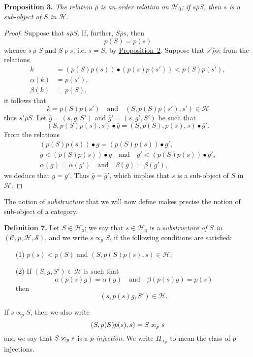 \documentclass[a4paper,oneside,nobib,nofonts,notitlepage,notoc,nols,fleqn,justified]{tufte-book}
\newenvironment{itenv}[1]
  {\phantomsection\par\medskip\noindent\textbf{#1.}\itshape}
  {\par\medskip}
\newenvironment{rmenv}[1]
  {\phantomsection\par\medskip\noindent\textbf{#1.}\rmfamily}
  {\par\medskip}
\newcommand{\oldpage}[1]{{\reversemarginpar\marginnote{\raggedleft\footnotesize\textit{p.~#1}}}}
\newcommand{\CC}{\mathcal{C}}
\newcommand{\HH}{\mathcal{H}}
\renewcommand{\SS}{\mathcal{S}}
\newcommand{\relrho}{\mathrel{\rho}}
\newcommand{\relrhobar}{\mathrel{\bar{\rho}}}
\newcommand{\subs}{\mathrel{\propto}}
\newcommand{\sups}{\mathrel{\reflectbox{$\propto$}}}
\begin{document}
\begin{itenv}{Proposition 3}
\label{proposition:3}
  The relation $\relrhobar$ is an order relation on $\HH_0$;
  if $s\relrhobar S$, then $s$ is a sub-object \cite{5} of $S$ in $\HH$.
\end{itenv}

\begin{proof}
  Suppose that $s\relrhobar S$.
  If, further, $S\relrhobar s$, then
  \[
    p(S)=p(s)
  \]
  whence $s\relrho S$ and $S\relrho s$, i.e. $s=S$, by \hyperref[Proposition~2]{Proposition~2}.
  Suppose that $s'\relrhobar s$;
  from the relations
  \[
    \begin{aligned}
      k
      &= (p(S)p(s))\bullet(p(s)p(s'))
      < p(S)p(s'),
    \\\alpha(k)&=p(s'),
    \\\beta(k)&=p(S),
    \end{aligned}
  \]
  it follows that
  \[
    k=p(S)p(s')
    \quad\text{and}\quad
    (S,p(S)p(s'),s')\in\HH
  \]
  thus $s'\relrhobar S$.
  \oldpage{360}
  Let $\bar{g}=(s,g,S')$ and $\bar{g}'=(s,g',S')$ be such that
  \[
    (S,p(S)p(s),s)\bullet\bar{g}
    = (S,p(S),p(s),s)\bullet\bar{g}'.
  \]
  From the relations
  \[
    \begin{gathered}
      (p(S)p(s))\bullet g = (p(S)p(s))\bullet g',
    \\g < (p(S)p(s))\bullet g
      \quad\text{and}\quad
      g' < (p(S)p(s))\bullet g',
    \\\alpha(g)=\alpha(g')
      \quad\text{and}\quad
      \beta(g)=\beta(g'),
    \end{gathered}
  \]
  we deduce that $g=g'$.
  Thus $\bar{g}=\bar{g}'$, which implies that $s$ is a sub-object of $S$ in $\HH$.
\end{proof}

The notion of \emph{substructure} that we will now define makes precise the notion of sub-object of a category.

\begin{rmenv}{Definition 7}
\label{definition:7}
  Let $S\in\HH_0$;
  we say that $s\in\HH_0$ is a \emph{substructure of $S$ in $(\CC,p,\HH,\SS)$}, and we write $s\subs_p S$, if the following conditions are satisfied:
  \begin{enumerate}
    \item[\normalfont(1)]
      $p(s)<p(S)$ and $(S,p(S)p(s),s)\in\HH$;
    \item[\normalfont(2)]
      If $(S,g,S')\in\HH$ is such that
      \[
        \alpha(p(s)g)=\alpha(g)
        \quad\text{and}\quad
        \beta(p(s)g)=p(s)
      \]
      then
      \[
        (s,p(s)g,S')\in\HH.
      \]
  \end{enumerate}
  If $s\subs_pS$, then we also write
  \[
    (S,p(S)p(s),s)
    = S\sups_p s
  \]
  and we say that $S\sups_p s$ is a \emph{$p$-injection}.
  We write $H_{\subs_p}$ to mean the class of $p$-injections.
\end{rmenv}
\end{document}

